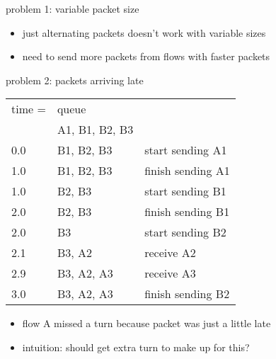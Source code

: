 \begin{frame}{problem 1: variable packet size}
    \begin{itemize}
        \item just alternating packets doesn't work with variable sizes
        \item need to send more packets from flows with faster packets
    \end{itemize}
\end{frame}

\begin{frame}{problem 2: packets arriving late}
\small
\begin{tabular}{lll}
time = & queue & \\
 & A1, B1, B2, B3 & \\
0.0 & B1, B2, B3 & start sending A1 \\
1.0 & B1, B2, B3 & finish sending A1 \\
1.0 & B2, B3 & start sending B1 \\
2.0 & B2, B3 & finish sending B1 \\
2.0 & B3 & start sending B2 \\
2.1 & B3, A2 & receive A2 \\
2.9 & B3, A2, A3 & receive A3 \\
3.0 & B3, A2, A3 & finish sending B2 \\
\end{tabular}
\begin{itemize}
\item<2-> flow A missed a turn because packet was just a little late
\item<2-> intuition: should get extra turn to make up for this?
\end{itemize}
\end{frame}

